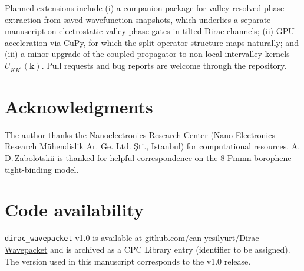\documentclass[preprint, 11pt]{elsarticle}
\newcommand{\dirac}{\texttt{dirac\_wavepacket}\xspace}
\begin{document}
Planned extensions include (i) a companion package for
valley-resolved phase extraction from saved wavefunction snapshots,
which underlies a separate manuscript on electrostatic valley phase
gates in tilted Dirac channels; (ii) GPU acceleration via CuPy, for
which the split-operator structure maps naturally; and (iii) a minor
upgrade of the coupled propagator to non-local intervalley kernels
$U_{KK^\prime}(\mathbf{k})$. Pull requests and bug reports are welcome
through the repository.

\section*{Acknowledgments}

The author thanks the Nanoelectronics Research Center (Nano
Electronics Research M\"uhendislik Ar. Ge. Ltd. \c{S}ti., Istanbul)
for computational resources. A.\,D.\,Zabolotskii is thanked for
helpful correspondence on the 8-Pmmn borophene tight-binding model.

\section*{Code availability}

\dirac v1.0 is available at
\href{https://github.com/can-yesilyurt/Dirac-Wavepacket}{github.com/can-yesilyurt/Dirac-Wavepacket}
and is archived as a CPC Library entry (identifier to be assigned).
The version used in this manuscript corresponds to the v1.0 release.
\end{document}
